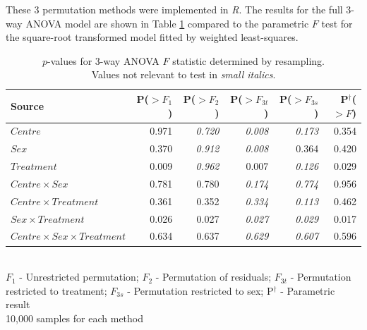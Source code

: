 These 3 permutation methods were implemented in \emph{R}. The results for the full 3-way ANOVA model are shown in Table \ref{aovresamp} compared to the parametric $F$ test for the square-root transformed model fitted by weighted least-squares.
\begin{table}[h]
\centering
\caption{$p$-values for 3-way ANOVA $F$ statistic determined by resampling.\\Values not relevant to test in \small{\textit{small italics}}.}\label{aovresamp}
\begin{tabular}{l|rrrr|r}                   
Source						&P($>F_{1}$)&P($>F_{2}$)&P($>F_{3t}$)&P($>F_{3s}$)&P$^{\dag}$($>F$)\\
\hline
$Centre$     					& 0.971 & \small{\textit{0.720}} & \small{\textit{0.008}} & \small{\textit{0.173}} & 0.354 \\    
$Sex$        					& 0.370 & \small{\textit{0.912}} & \small{\textit{0.008}} & 0.364 & 0.420 \\  
$Treatment$  					& 0.009 & \small{\textit{0.962}} & 0.007 			   & \small{\textit{0.126}} & 0.029 \\
$Centre\times Sex$ 				& 0.781 & 0.780 			& \small{\textit{0.174}} & \small{\textit{0.774}} & 0.956 \\
$Centre\times Treatment$ 		& 0.361 & 0.352 			& \small{\textit{0.334}} & \small{\textit{0.113}} & 0.462 \\
$Sex\times Treatment$     		& 0.026 & 0.027 			& \small{\textit{0.027}} & \small{\textit{0.029}} & 0.017 \\
$Centre\times Sex\times Treatment$& 0.634 & 0.637 			& \small{\textit{0.629}} & \small{\textit{0.607}} & 0.596
\end{tabular}\\
$F_{1}$ - Unrestricted permutation; $F_{2}$ - Permutation of residuals; $F_{3t}$ - Permutation restricted to treatment; $F_{3s}$ - Permutation restricted to sex; P$^{\dag}$ - Parametric result\\
10,000 samples for each method
\end{table}

